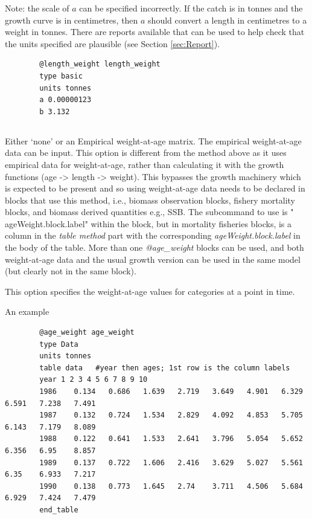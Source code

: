 Note: the scale of $a$ can be specified incorrectly. If the catch is in tonnes and the growth curve is in centimetres, then $a$ should convert a length in centimetres to a weight in tonnes. There are reports available that can be used to help check that the units specified are plausible (see Section \ref{sec:Report}).

{\small{\begin{verbatim}
		@length_weight length_weight
		type basic
		units tonnes
		a 0.00000123
		b 3.132
\end{verbatim}}}

\subsection{}\label{sec:AgeWeight} 

Either `none' \label{sec:AgeWeight-None} or an Empirical weight-at-age matrix. The empirical weight-at-age data can be input\label{sec:AgeWeight-Data}. This option is different from the method above as it uses empirical data for weight-at-age, rather than calculating it with the growth functions (age -> length -> weight). This bypasses the growth machinery which is expected to be present and so using weight-at-age data  needs to be declared in blocks that use this method, i.e., biomass observation blocks, fishery mortality blocks, and biomass derived quantities e.g., SSB. The subcommand to use is " ageWeight.block.label" within the block, but in mortality fisheries blocks,  is a column in the \textit{table method} part with the corresponding \textit{ageWeight.block.label} in the body of the table. More than one \textit{@age\_weight} blocks can be used, and both  weight-at-age data and the usual growth version can be used in the same model (but clearly not in the same block).

This option specifies the weight-at-age values for categories at a point in time.

An example

{\small{\begin{verbatim}
		@age_weight age_weight
		type Data
		units tonnes
		table data   #year then ages; 1st row is the column labels
		year 1 2 3 4 5 6 7 8 9 10
		1986	0.134	0.686	1.639	2.719	3.649	4.901	6.329	6.591	7.238	7.491
		1987	0.132	0.724	1.534	2.829	4.092	4.853	5.705	6.143	7.179	8.089
		1988	0.122	0.641	1.533	2.641	3.796	5.054	5.652	6.356	6.95	8.857
		1989	0.137	0.722	1.606	2.416	3.629	5.027	5.561	6.35	6.933	7.217
		1990	0.138	0.773	1.645	2.74	3.711	4.506	5.684	6.929	7.424	7.479
		end_table
\end{verbatim}}}

